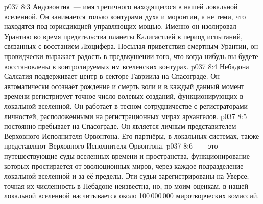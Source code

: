 \vs p037 8:3 Андовонтия~--- имя третичного  находящегося в нашей локальной вселенной. Он занимается только контурами духа и моронтии, а не теми, что находятся под юрисдикцией управляющих мощью. Именно он изолировал Урантию во время предательства планеты Калигастией в период испытаний, связанных с восстанием Люцифера. Посылая приветствия смертным Урантии, он провидчески выражает радость в предвкушении того, что когда\hyp{}нибудь вы будете восстановлены в контролируемых им вселенских контурах.
\vs p037 8:4  Небадона Салсатия поддерживает центр в секторе Гавриила на Спасограде. Он автоматически осознаёт рождение и смерть воли и в каждый данный момент времени регистрирует точное число волевых созданий, функционирующих в локальной вселенной. Он работает в тесном сотрудничестве с регистраторами личностей, расположенными на регистрационных мирах архангелов.
\vs p037 8:5  постоянно пребывает на Спасограде. Он является личным представителем Верховного Исполнителя Орвонтона. Его партнёры,  в локальных системах, также представляют Верховного Исполнителя Орвонтона.
\vs p037 8:6 ~--- это путешествующие суды вселенных времени и пространства, функционирование которых простирается от эволюционных миров, через каждое подразделение локальной вселенной и за её пределы. Эти судьи зарегистрированы на Уверсе; точная их численность в Небадоне неизвестна, но, по моим оценкам, в нашей локальной вселенной насчитывается около 100\,000\,000 миротворческих комиссий.
